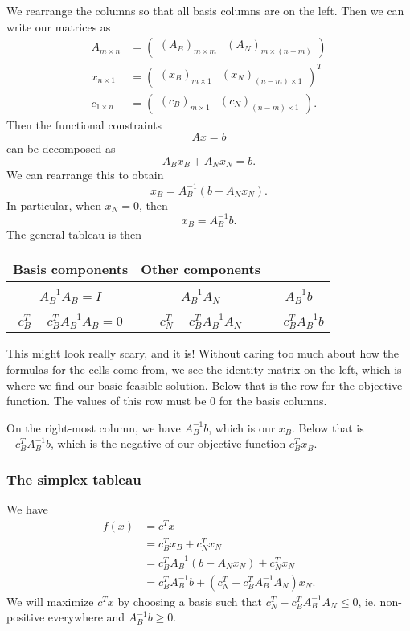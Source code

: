 \documentclass[a4paper]{article}
\begin{document}
We rearrange the columns so that all basis columns are on the left. Then we can write our matrices as
\begin{align*}
  A_{m\times n} &=
  \begin{pmatrix}
    (A_B)_{m\times m} & (A_N)_{m\times (n - m)}
  \end{pmatrix}\\
  x_{n\times 1} &=
  \begin{pmatrix}
    (x_B)_{m\times 1} & (x_N)_{(n - m)\times 1}
  \end{pmatrix}^T\\
  c_{1\times n} &=
  \begin{pmatrix}
    (c_B)_{m\times 1} & (c_N)_{(n - m)\times 1}
  \end{pmatrix}.
\end{align*}
Then the functional constraints
\[
  Ax = b
\]
can be decomposed as
\[
  A_Bx_B + A_Nx_N = b.
\]
We can rearrange this to obtain
\[
  x_B = A_B^{-1}(b - A_N x_N).
\]
In particular, when $x_N = 0$, then
\[
  x_B = A_B^{-1}b.
\]
The general tableau is then
\begin{center}
  \begin{tabular}{ccc}
    \toprule
    Basis components & Other components\\
    \midrule\\
    $A_B^{-1} A_B = I$ & $A_B^{-1}A_N$ & $A_B^{-1}b$\\\\
    \midrule
    \quad$c^T_B - c^T_BA_B^{-1}A_B = 0$\quad & \quad$c_N^T - c_B^TA_B^{-1}A_N$\quad & $-c_B^T A_B^{-1}b$\\
    \bottomrule
  \end{tabular}
\end{center}
This might look really scary, and it is! Without caring too much about how the formulas for the cells come from, we see the identity matrix on the left, which is where we find our basic feasible solution. Below that is the row for the objective function. The values of this row must be $0$ for the basis columns.

On the right-most column, we have $A_B^{-1}b$, which is our $x_B$. Below that is $-c_B^TA_B^{-1}b$, which is the negative of our objective function $c_B^Tx_B$.
\subsubsection{The simplex tableau}
We have
\begin{align*}
  f(x) &= c^T x \\
  &= c_B^T x_B + c_N^T x_N\\
  &= c_B^T A_B^{-1}(b - A_N x_N) + c_N^T x_N\\
  &= c_B^T A_B^{-1}b + (c_N^T - c_B^TA_B^{-1}A_N)x_N.
\end{align*}
We will maximize $c^T x$ by choosing a basis such that $c_N^T - c_B^T A_B^{-1}A_N \leq 0$, ie. non-positive everywhere and $A_B^{-1}b \geq 0$.
\end{document}
